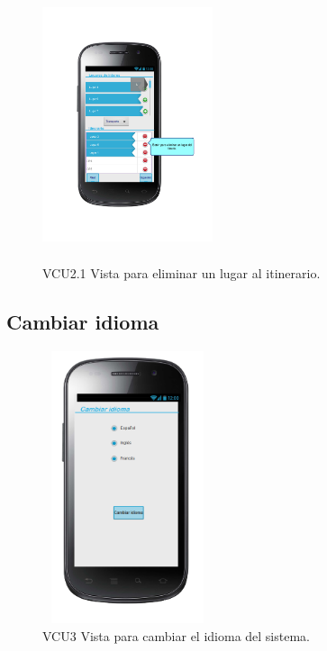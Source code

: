 \begin{figure}[h]
  \centering
    \includegraphics[width=5cm,height=8cm]{Imagenes/VistasSistema/CU2_2.png}
  \caption{VCU2.1 Vista para eliminar un lugar al itinerario.}  
\end{figure}

\newpage
\subsection{Cambiar idioma}

\begin{figure}[h]
  \centering
    \includegraphics[width=5cm,height=8cm]{Imagenes/VistasSistema/CU3.png}
  \caption{VCU3 Vista para cambiar el idioma del sistema.}  
\end{figure}

  